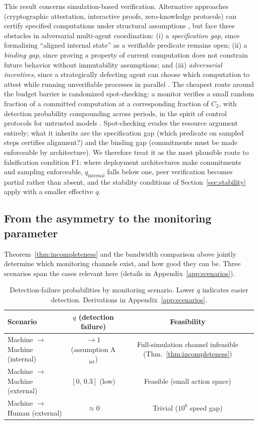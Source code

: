 \documentclass[manuscript,screen,review]{jair}
\begin{document}
This result concerns simulation-based verification. Alternative approaches (cryptographic attestation, interactive proofs, zero-knowledge protocols) can certify specified computations under structural assumptions \cite{verification.methods.2024}, but face three obstacles in adversarial multi-agent coordination: (i) a \emph{specification gap}, since formalizing ``aligned internal state'' as a verifiable predicate remains open; (ii) a \emph{binding gap}, since proving a property of current computation does not constrain future behavior without immutability assumptions; and (iii) \emph{adversarial incentives}, since a strategically defecting agent can choose which computation to attest while running unverifiable processes in parallel \cite{greenblatt.2023,park.2023}. The cheapest route around the budget barrier is randomized spot-checking: a monitor verifies a small random fraction of a committed computation at a corresponding fraction of $C_2$, with detection probability compounding across periods, in the spirit of control protocols for untrusted models \cite{greenblatt.2023}. Spot-checking evades the resource argument entirely; what it inherits are the specification gap (which predicate on sampled steps certifies alignment?) and the binding gap (commitments must be made enforceable by architecture). We therefore treat it as the most plausible route to falsification condition F1: where deployment architectures make commitments and sampling enforceable, $q_{\mathrm{internal}}$ falls below one, peer verification becomes partial rather than absent, and the stability conditions of Section~\ref{sec:stability} apply with a smaller effective $q$.

\subsection{From the asymmetry to the monitoring parameter}
\label{sec:qderivation}

Theorem~\ref{thm:incompleteness} and the bandwidth comparison above jointly determine which monitoring channels exist, and how good they can be. Three scenarios span the cases relevant here (details in Appendix~\ref{app:scenarios}).

\begin{table}
\caption{Detection-failure probabilities by monitoring scenario. Lower $q$ indicates easier detection. Derivations in Appendix~\ref{app:scenarios}.}
\label{tab:monitoring}
\centering
\begin{tabular}{lcc}
\toprule
\textbf{Scenario} & $q$ \textbf{(detection failure)} & \textbf{Feasibility} \\
\midrule
Machine $\to$ Machine (internal) & $\to 1$ (assumption A$_{\mathrm{int}}$) & Full-simulation channel infeasible (Thm.~\ref{thm:incompleteness}) \\
Machine $\to$ Machine (external) & $[0,\,0.3]$ (low) & Feasible (small action space) \\
Machine $\to$ Human (external)   & $\approx 0$    & Trivial ($10^6$ speed gap) \\
\bottomrule
\end{tabular}
\end{table}
\end{document}
